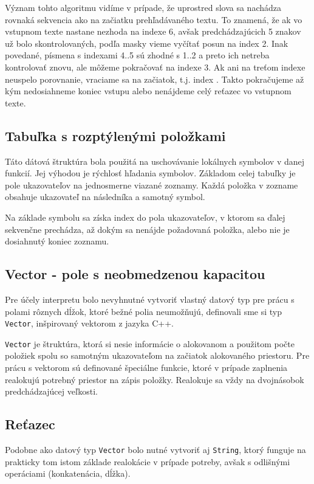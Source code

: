 \documentclass[12pt,a4paper,titlepage,final]{article}
\begin{document}
Význam tohto algoritmu vidíme v prípade, že uprostred slova sa nachádza
 rovnaká sekvencia ako na začiatku prehľadávaného textu.
To znamená, že ak vo vstupnom texte nastane nezhoda na indexe 6, avšak
 predchádzajúcich 5 znakov už bolo skontrolovaných, podľa masky vieme vyčítať
 posun na index 2. Inak povedané, písmena s indexami 4..5 sú zhodné s 1..2
 a preto ich netreba kontrolovať znovu, ale môžeme pokračovať na indexe 3.
Ak ani na treťom indexe neuspelo porovnanie, vraciame sa na začiatok, t.j.
index . Takto pokračujeme až kým nedosiahneme koniec vstupu alebo
nenájdeme celý reťazec vo vstupnom texte.

\subsection{Tabuľka s rozptýlenými položkami}
Táto dátová štruktúra bola použitá na uschovávanie lokálnych symbolov v danej
 funkcií. Jej výhodou je rýchlosť hľadania symbolov. 
Základom celej tabuľky je pole ukazovateľov na jednosmerne viazané zoznamy.
Každá položka v zozname obsahuje ukazovateľ na následníka a samotný symbol.

Na základe symbolu sa získa index do pola ukazovateľov, v ktorom sa ďalej
 sekvenčne prechádza, až dokým sa nenájde požadovaná položka, alebo nie je
 dosiahnutý koniec zoznamu.
 
\subsection{Vector - pole s neobmedzenou kapacitou}
Pre účely interpretu bolo nevyhnutné vytvoriť vlastný datový typ pre prácu
s polami rôznych dĺžok, ktoré bežné polia neumožňujú, definovali sme si
typ \texttt{Vector}, inšpirovaný vektorom z jazyka C++. 

\texttt{Vector} je štruktúra, ktorá si nesie informácie o alokovanom a použitom 
počte položiek spolu so samotným ukazovateľom na začiatok alokovaného priestoru. 
Pre prácu s vektorom sú definované špeciálne funkcie, ktoré v prípade zaplnenia
realokujú potrebný priestor na zápis položky. Realokuje sa vždy na dvojnásobok
predchádzajúcej veľkosti.


\subsection{Reťazec}
Podobne ako datový typ \texttt{Vector} bolo nutné vytvoriť aj \texttt{String},
ktorý funguje na prakticky tom istom základe realokácie v prípade potreby,
avšak s odlišnými operáciami (konkatenácia, dĺžka).
\end{document}
